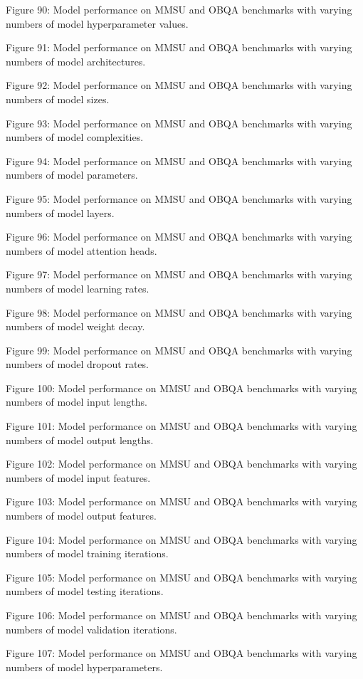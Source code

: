         Figure 90: Model performance on MMSU and OBQA benchmarks with varying numbers of model hyperparameter values.

        Figure 91: Model performance on MMSU and OBQA benchmarks with varying numbers of model architectures.

        Figure 92: Model performance on MMSU and OBQA benchmarks with varying numbers of model sizes.

        Figure 93: Model performance on MMSU and OBQA benchmarks with varying numbers of model complexities.

        Figure 94: Model performance on MMSU and OBQA benchmarks with varying numbers of model parameters.

        Figure 95: Model performance on MMSU and OBQA benchmarks with varying numbers of model layers.

        Figure 96: Model performance on MMSU and OBQA benchmarks with varying numbers of model attention heads.

        Figure 97: Model performance on MMSU and OBQA benchmarks with varying numbers of model learning rates.

        Figure 98: Model performance on MMSU and OBQA benchmarks with varying numbers of model weight decay.

        Figure 99: Model performance on MMSU and OBQA benchmarks with varying numbers of model dropout rates.

        Figure 100: Model performance on MMSU and OBQA benchmarks with varying numbers of model input lengths.

        Figure 101: Model performance on MMSU and OBQA benchmarks with varying numbers of model output lengths.

        Figure 102: Model performance on MMSU and OBQA benchmarks with varying numbers of model input features.

        Figure 103: Model performance on MMSU and OBQA benchmarks with varying numbers of model output features.

        Figure 104: Model performance on MMSU and OBQA benchmarks with varying numbers of model training iterations.

        Figure 105: Model performance on MMSU and OBQA benchmarks with varying numbers of model testing iterations.

        Figure 106: Model performance on MMSU and OBQA benchmarks with varying numbers of model validation iterations.

        Figure 107: Model performance on MMSU and OBQA benchmarks with varying numbers of model hyperparameters.

